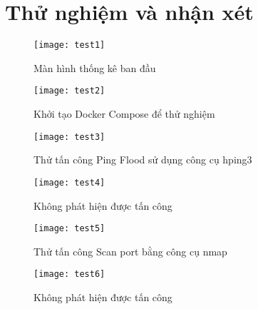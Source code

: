 \section{Thử nghiệm và nhận xét}
\begin{figure}[!htbp]
    \centering
    \texttt{[image: test1]}
    \caption{Màn hình thống kê ban đầu}
    \label{fig:x cubed graph}
\end{figure}
\FloatBarrier
\begin{figure}[!htbp]
    \centering
    \texttt{[image: test2]}
    \caption{Khởi tạo Docker Compose để thử nghiệm}
    \label{fig:x cubed graph}
\end{figure}
\FloatBarrier
\begin{figure}[!htbp]
    \centering
    \texttt{[image: test3]}
    \caption{Thử tấn công Ping Flood sử dụng công cụ hping3}
    \label{fig:x cubed graph}
\end{figure}
\FloatBarrier
\begin{figure}[!htbp]
    \centering
    \texttt{[image: test4]}
    \caption{Không phát hiện được tấn công}
    \label{fig:x cubed graph}
\end{figure}
\FloatBarrier
\begin{figure}[!htbp]
    \centering
    \texttt{[image: test5]}
    \caption{Thử tấn công Scan port bằng công cụ nmap}
    \label{fig:x cubed graph}
\end{figure}
\FloatBarrier
\begin{figure}[!htbp]
    \centering
    \texttt{[image: test6]}
    \caption{Không phát hiện được tấn công}
    \label{fig:x cubed graph}
\end{figure}
\FloatBarrier